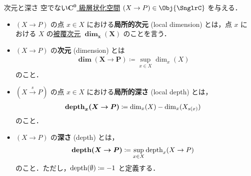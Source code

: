 \documentclass[TQFT_main]{subfiles}
\begin{document}
\begin{mydef}[label=def:dim-depth,breakable]{次元と深さ}
    空でない\hyperref[def:Snglr-C0]{$\bm{C^0}$ 級層状化空間} $(X \to P) \in \Obj{\SnglrC}$ を与える．
    \begin{itemize}
        \item $(X \to P)$ の点 $x \in X$ における\textbf{局所的次元} (local dimension) とは，点 $x$ における $X$ の\hyperref[def:covering-dim]{被覆次元}
        $\bm{\dim_x(X)}$ のことを言う．
        \item $(X \to P)$ の\textbf{次元} (dimension) とは
        \begin{align}
            \bm{\dim (X \to P)} \coloneqq \sup_{x \in X} \dim_x (X)
        \end{align}
        のこと．
        \item $(X \xrightarrow{s} P)$ の点 $x \in X$ における\textbf{局所的深さ} (local depth) とは，
        \begin{align}
            \bm{\depth_x(X \to P)} \coloneqq \dim_x (X) - \dim_x (X_{s(x)})
        \end{align}
        のこと．
        \item $(X \to P)$ の\textbf{深さ} (depth) とは，
        \begin{align}
            \bm{\depth(X \to P)} \coloneqq \sup_{x \in X} \depth_x(X \to P)
        \end{align}
        のこと．ただし，$\operatorname{depth} (\emptyset) \coloneqq -1$ と定義する．
    \end{itemize}
\end{mydef}
\end{document}
